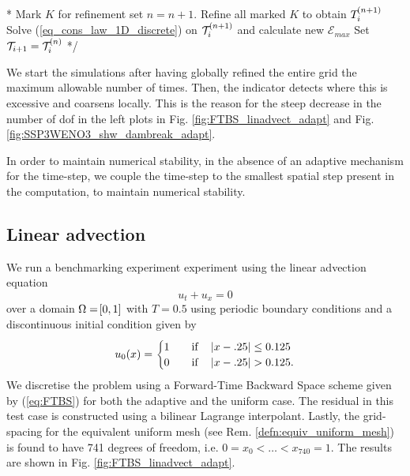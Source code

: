 \documentclass[final]{amsart}
\numberwithin{equation}{section}
\begin{document}
\/*
\State Mark $K$ for refinement
\EndIf
\EndFor
\State set $n=n+1$.
\State Refine all marked $K$ to obtain $T_i^{\!\left({n+1}\right)}$
\State Solve (\ref{eq_cons_law_1D_discrete}) on $\mathcal{T}_i^{\!\left({n+1}\right)}$ and calculate new $\mathcal{E}_{max}$
\EndWhile
\State Set $\mathcal{T}_{i+1}=\mathcal{T}_i^{\!\left({n}\right)}$
*/


\begin{Rem} We start the simulations after having globally refined the entire grid the maximum allowable number of times.  Then, the indicator detects where this is excessive and coarsens locally.  This is the reason for  the steep decrease in the number of dof in the left plots in Fig. \ref{fig:FTBS_linadvect_adapt} and Fig. \ref{fig:SSP3WENO3_shw_dambreak_adapt}.
\end{Rem}
\begin{Rem}  In order to maintain numerical stability, in the absence of an adaptive mechanism for the time-step, we  couple the time-step to the smallest spatial step present in the computation, to maintain numerical stability.
\end{Rem}

\subsection{Linear advection}
We run a benchmarking experiment experiment using the linear advection equation
\begin{equation}
u_t+u_x=0
\end{equation}
over a domain $\Omega = \!\left[{0,1}\right]$ with $T=0.5$ using periodic boundary conditions and a discontinuous initial condition given by
\begin{equation}\label{eq_ic_step}
u_0\qp{x}=\begin{cases}
1\quad&\text{if}\quad \norm{x-.25}\leq 0 .125\\
0\quad&\text{if} \quad \norm{x-.25}>  0.125.
\end{cases}
\end{equation}
We discretise the problem using a Forward-Time Backward Space scheme given by (\ref{eq:FTBS}) for both the adaptive and the uniform case. The residual in this test case is constructed using a bilinear Lagrange interpolant.  Lastly, the grid-spacing for the equivalent uniform mesh (see Rem. \ref{defn:equiv_uniform_mesh}) is found to have 741 degrees of freedom, i.e. $0=x_0<\dots<x_{740}=1$.  The results are shown in Fig. \ref{fig:FTBS_linadvect_adapt}.
\end{document}
